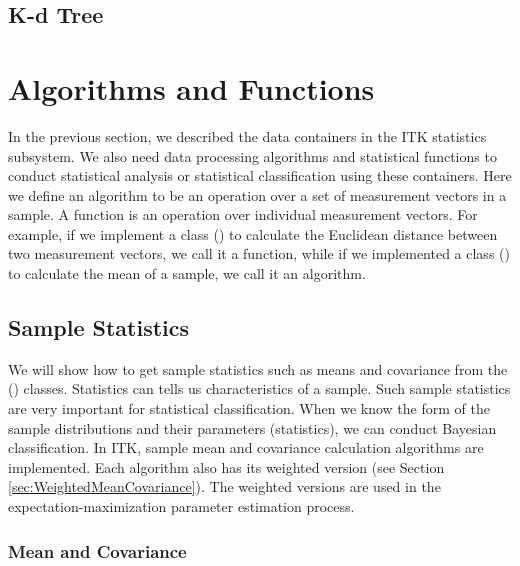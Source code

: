 \ifitkFullVersion

\fi


\subsection{K-d Tree}
\label{sec:KdTree}

\ifitkFullVersion

\fi

\section{Algorithms and Functions}
\label{sec:StatisticsAlgorithmsFunctions}

In the previous section, we described the data containers in the ITK
statistics subsystem. We also need data processing algorithms and statistical
functions to conduct statistical analysis or statistical classification using
these containers. Here we define an algorithm to be an operation over a set
of measurement vectors in a sample. A function is an operation over
individual measurement vectors. For example, if we implement a class
() to calculate the Euclidean
distance between two measurement vectors, we call it a function, while if we
implemented a class () to calculate
the mean of a sample, we call it an algorithm.

\subsection{Sample Statistics}
\label{sec:SampleStatistics}

We will show how to get sample statistics such as means and covariance from
the () classes. Statistics can tells us
characteristics of a sample. Such sample statistics are very important for
statistical classification. When we know the form of the sample distributions
and their parameters (statistics), we can conduct Bayesian classification. In
ITK, sample mean and covariance calculation algorithms are implemented. Each
algorithm also has its weighted version (see Section
\ref{sec:WeightedMeanCovariance}). The weighted versions are used in the
expectation-maximization parameter estimation process.

\subsubsection{Mean and Covariance}
\label{sec:MeanCovariance}

